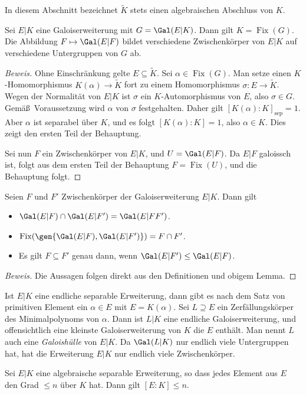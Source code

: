 \documentclass[12pt,a4paper,twoside]{article}
\newcommand{\ei}[1]{\emph{#1}\index{#1}}
\DeclareMathOperator{\Fix}{Fix}
\begin{document}
In diesem Abschnitt bezeichnet $\tilde K$ stets einen algebraischen Abschluss
von $K$.
\begin{Lemma}
  Sei $E|K$ eine Galoiserweiterung mit $G=\Gal(E|K)$. Dann gilt
  $K=\Fix(G)$. Die Abbildung $F\mapsto\Gal(E|F)$ bildet verschiedene
  Zwischenk\"orper von $E|K$ auf verschiedene Untergruppen von $G$ ab.
\end{Lemma}
\begin{proof}[Beweis]
  Ohne Einschr\"ankung gelte $E\subseteq\tilde K$. Sei $\alpha\in\Fix(G)$. Man
  setze einen $K$-Homomorphismus $K(\alpha)\to\tilde K$ fort zu einem
  Homomorphismus $\sigma:E\to\tilde K$. Wegen der Normalit\"at von $E|K$ ist
  $\sigma$ ein $K$-Automorphismus von $E$, also $\sigma\in G$. Gem\"a\ss\ 
  Voraussetzung wird $\alpha$ von $\sigma$ festgehalten. Daher gilt
  $[K(\alpha):K]_\text{sep}=1$. Aber $\alpha$ ist separabel \"uber $K$, und es
  folgt $[K(\alpha):K]=1$, also $\alpha\in K$. Dies zeigt den ersten Teil der
  Behauptung.
  
  Sei nun $F$ ein Zwischenk\"orper von $E|K$, und $U=\Gal(E|F)$. Da $E|F$
  galoissch ist, folgt aus dem ersten Teil der Behauptung $F=\Fix(U)$, und die
  Behauptung folgt.
\end{proof}
\begin{Lemma}
  Seien $F$ und $F'$ Zwischenk\"orper der Galoiserweiterung $E|K$. Dann gilt
  \begin{itemize}
  \item[(a)] $\Gal(E|F)\cap\Gal(E|F')=\Gal(E|FF')$.
\item[(b)] $\Fix(\gen{\Gal(E|F),\Gal(E|F')})=F\cap F'$.
\item[(c)] Es gilt $F\subseteq F'$ genau dann, wenn $\Gal(E|F')\le\Gal(E|F)$.
  \end{itemize}
\end{Lemma}
\begin{proof}[Beweis]
  Die Aussagen folgen direkt aus den Definitionen und obigem Lemma.
\end{proof}
Ist $E|K$ eine endliche separable Erweiterung, dann gibt es nach dem Satz von
primitiven Element ein $\alpha\in E$ mit $E=K(\alpha)$. Sei $L\supseteq E$ ein
Zerf\"allungsk\"orper des Minimalpolynoms von $\alpha$. Dann ist $L|K$ eine
endliche Galoiserweiterung, und offensichtlich eine kleinste Galoiserweiterung
von $K$ die $E$ enth\"alt. Man nennt $L$ auch eine \ei{Galoish\"ulle} von
$E|K$. Da $\Gal(L|K)$ nur endlich viele Untergruppen hat, hat die Erweiterung
$E|K$ nur endlich viele Zwischenk\"orper.
\begin{Lemma}
  Sei $E|K$ eine algebraische separable Erweiterung, so dass jedes Element aus
  $E$ den Grad $\le n$ \"uber $K$ hat. Dann gilt $[E:K]\le n$.
\end{Lemma}
\end{document}
